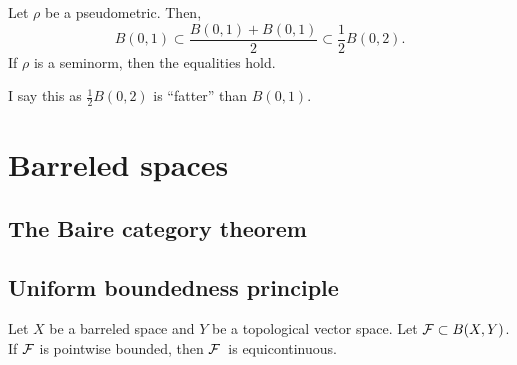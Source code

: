 \documentclass{../crs}
\begin{document}
\begin{prop}
Let $\rho$ be a pseudometric.
Then,
\[B(0,1)\subset\frac{B(0,1)+B(0,1)}2\subset\frac12B(0,2).\]
If $\rho$ is a seminorm, then the equalities hold.
\end{prop}
I say this as $\frac12B(0,2)$ is ``fatter'' than $B(0,1)$.







\section{Barreled spaces}

\subsection{The Baire category theorem}

\subsection{Uniform boundedness principle}
\begin{thm}
Let $X$ be a barreled space and $Y$ be a topological vector space.
Let $\mathcal{F}\subset B(X,Y)$.
If $\mathcal{F}$ is pointwise bounded, then $\mathcal{F}$\ is equicontinuous.
\end{thm}
\end{document}
